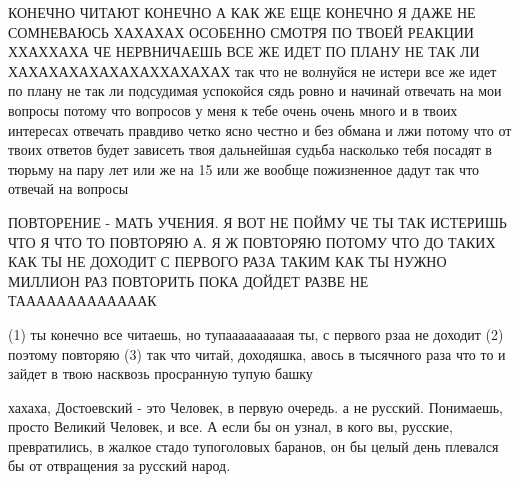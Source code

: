 КОНЕЧНО ЧИТАЮТ КОНЕЧНО А КАК ЖЕ ЕЩЕ КОНЕЧНО Я ДАЖЕ НЕ СОМНЕВАЮСЬ ХАХАХАХ
ОСОБЕННО СМОТРЯ ПО ТВОЕЙ РЕАКЦИИ ХХАХХАХА ЧЕ НЕРВНИЧАЕШЬ ВСЕ ЖЕ ИДЕТ ПО ПЛАНУ
НЕ ТАК ЛИ ХАХАХАХАХАХАХАХХАХАХАХ так что не волнуйся не истери все же идет по плану не так 
ли подсудимая успокойся сядь ровно и начинай отвечать на мои вопросы потому что вопросов у меня к тебе 
очень очень много и в твоих интересах отвечать правдиво четко ясно честно и без обмана и лжи
потому что от твоих ответов будет зависеть твоя дальнейшая судьба насколько тебя посадят в тюрьму
на пару лет или же на 15 или же вообще пожизненное дадут так что отвечай на вопросы

ПОВТОРЕНИЕ - МАТЬ УЧЕНИЯ. Я ВОТ НЕ ПОЙМУ ЧЕ ТЫ ТАК ИСТЕРИШЬ ЧТО Я ЧТО ТО
ПОВТОРЯЮ А. Я Ж ПОВТОРЯЮ ПОТОМУ ЧТО ДО ТАКИХ КАК ТЫ НЕ ДОХОДИТ С ПЕРВОГО РАЗА
ТАКИМ КАК ТЫ НУЖНО МИЛЛИОН РАЗ ПОВТОРИТЬ ПОКА ДОЙДЕТ РАЗВЕ НЕ ТАААААААААААААК

(1) ты конечно все читаешь, но тупаааааааааая ты, с первого рзаа не доходит (2)
поэтому повторяю (3) так что читай, доходяшка, авось в тысячного раза что то и
зайдет в твою насквозь просранную тупую башку

хахаха, Достоевский - это Человек, в первую очередь. а не русский. Понимаешь,
просто Великий Человек, и все. А если бы он узнал, в кого вы, русские,
превратились, в жалкое стадо тупоголовых баранов, он бы целый день плевался бы
от отвращения за русский народ.


